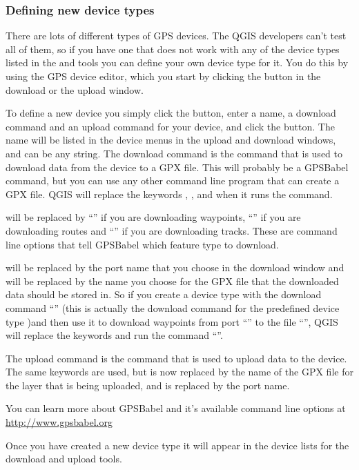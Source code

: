 \subsubsection{\label{sec:Defining-new-device}Defining new device types}

There are lots of different types of GPS devices.
The QGIS developers can't test all of them, so if you have one that does not work with any of the device types listed in the  and  tools you can define your own device type for it.
You do this by using the GPS device editor, which you start by clicking the  button in the download or the upload window.

To define a new device you simply click the  button, enter a name, a download command and an upload command for your device, and click the  button.
The name will be listed in the device menus in the upload and download windows, and can be any string.
The download command is the command that is used to download data from the device to a GPX file.
This will probably be a GPSBabel command, but you can use any other command line program that can create a GPX file.
QGIS will replace the keywords , , and  when it runs the command.

 will be replaced by {}``'' if you are downloading waypoints, {}``'' if you are downloading routes and {}``'' if you are downloading tracks.
These are command line options that tell GPSBabel which feature type to download.

 will be replaced by the port name that you choose in the download window and  will be replaced by the name you choose for the GPX file that the downloaded data should be stored in.
So if you create a device type with the download command {}``'' (this is actually the download command for the predefined device type )and then use it to download waypoints from port {}``'' to the file {}``'', QGIS will replace the keywords and run the command {}``''.

The upload command is the command that is used to upload data to the device.
The same keywords are used, but  is now replaced by the name of the GPX file for the layer that is being uploaded, and  is replaced by the port name.

You can learn more about GPSBabel and it's available command line options at \url{http://www.gpsbabel.org}

Once you have created a new device type it will appear in the device lists for the download and upload tools.
